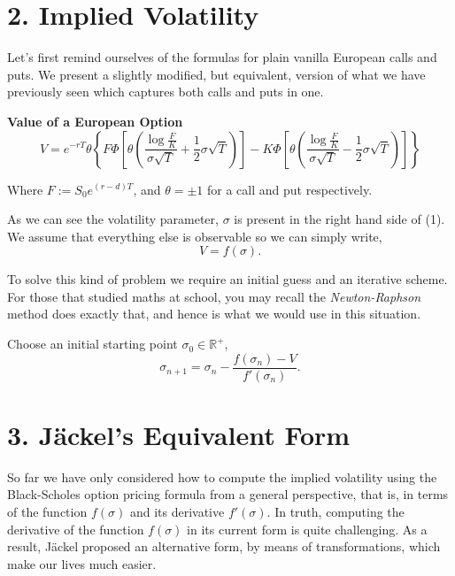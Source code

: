 \documentclass[11pt]{article}
\begin{document}
\section*{2. Implied Volatility}
Let's first remind ourselves of the formulas for plain vanilla European calls and puts. We present a slightly modified, but equivalent, version of what we have previously seen which captures both calls and puts in one. 

\newpage

\textbf{Value of a European Option} 
\begin{equation}
    V = e^{-rT} \theta \left\{F \Phi\left[\theta \left( \frac{\log\frac{F}{K}}{\sigma\sqrt{T}} + \frac{1}{2} \sigma\sqrt{T} \right)     \right] - K \Phi\left[\theta \left( \frac{\log\frac{F}{K}}{\sigma\sqrt{T}} - \frac{1}{2} \sigma\sqrt{T} \right) \right] \right\}
\end{equation}

Where $F := S_0 e^{(r-d)T}$, and $\theta = \pm 1$ for a call and put respectively.

As we can see the volatility parameter, $\sigma$ is present in the right hand side of (1). We assume that everything else is observable so we can simply write,
\begin{equation}
    V = f(\sigma).
\end{equation}

To solve this kind of problem we require an initial guess and an iterative scheme. For those that studied maths at school, you may recall the \textit{Newton-Raphson} method does exactly that, and hence is what we would use in this situation. 

Choose an initial starting point $\sigma_0 \in \mathbb{R}^+$,
\begin{equation}
    \sigma_{n+1} = \sigma_n - \frac{f(\sigma_n) - V}{f'(\sigma_n)}.
\end{equation}

\section*{3. Jäckel's Equivalent Form}
So far we have only considered how to compute the implied volatility using the Black-Scholes option pricing formula from a general perspective, that is, in terms of the function $f(\sigma)$ and its derivative $f'(\sigma)$. In truth, computing the derivative of the function $f(\sigma)$ in its current form is quite challenging. As a result, Jäckel proposed an alternative form, by means of transformations, which make our lives much easier.
\end{document}

